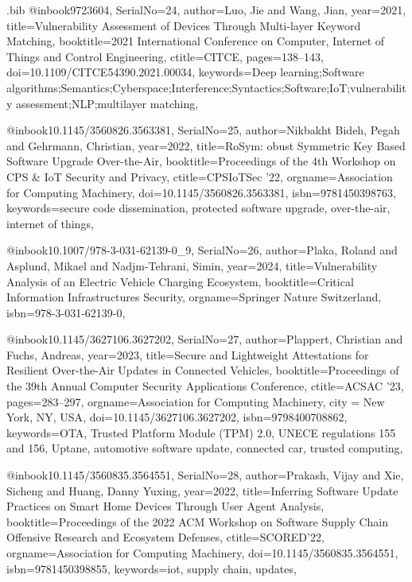 \documentclass[fleqn,s1,names,tex]{neptune}
\begin{document}
\begin{bibwrite}{\jobname.bib}
@inbook{9723604,
SerialNo={24},
author={Luo, Jie and Wang, Jian},
 year={2021},
title={Vulnerability Assessment of {} Devices Through Multi-layer Keyword
  Matching},
booktitle={2021 International Conference on Computer, Internet of Things and   Control Engineering},
ctitle={CITCE},
  pages={138--143},
doi={10.1109/CITCE54390.2021.00034},
 keywords={Deep learning;Software
  algorithms;Semantics;Cyberspace;Interference;Syntactics;Software;IoT;vulnerability
  assessment;NLP;multilayer matching},
}


@inbook{10.1145/3560826.3563381,
SerialNo={25},
author={Nikbakht Bideh, Pegah and Gehrmann, Christian},
 year={2022},
title={RoSym: obust Symmetric Key Based {} Software Upgrade Over-the-Air},
booktitle={Proceedings of the 4th Workshop on CPS \& IoT Security and   Privacy},
ctitle={CPSIoTSec '22},
 orgname={Association for Computing Machinery},
doi={10.1145/3560826.3563381},
 isbn={9781450398763},
 keywords={secure code dissemination, protected software upgrade, over-the-air,
  internet of things},
}


@inbook{10.1007/978-3-031-62139-0_9,
SerialNo={26},
author={Plaka, Roland and Asplund, Mikael and Nadjm-Tehrani, Simin},
 year={2024},
title={Vulnerability Analysis of an Electric Vehicle Charging Ecosystem},
booktitle={Critical Information Infrastructures Security},
 orgname={Springer Nature Switzerland},
 isbn={978-3-031-62139-0},
}


@inbook{10.1145/3627106.3627202,
SerialNo={27},
author={Plappert, Christian and Fuchs, Andreas},
 year={2023},
title={Secure and Lightweight  Attestations for Resilient Over-the-Air
  Updates in Connected Vehicles},
booktitle={Proceedings of the 39th Annual Computer Security Applications   Conference},
ctitle={ACSAC '23},
  pages={283--297},
 orgname={Association for Computing Machinery},
 city = {New York, NY, USA},
doi={10.1145/3627106.3627202},
 isbn={9798400708862},
 keywords={OTA, Trusted Platform Module (TPM) 2.0, UNECE regulations 155 and
  156, Uptane, automotive software update, connected car, trusted computing},
}


@inbook{10.1145/3560835.3564551,
SerialNo={28},
author={Prakash, Vijay and Xie, Sicheng and Huang, Danny Yuxing},
 year={2022},
title={Inferring Software Update Practices on Smart Home {} Devices Through
  User Agent Analysis},
booktitle={Proceedings of the 2022 ACM Workshop on Software Supply Chain   Offensive Research and Ecosystem Defenses},
ctitle={SCORED'22},
 orgname={Association for Computing Machinery},
doi={10.1145/3560835.3564551},
 isbn={9781450398855},
 keywords={iot, supply chain, updates},
}



\end{bibwrite}
\end{document}
